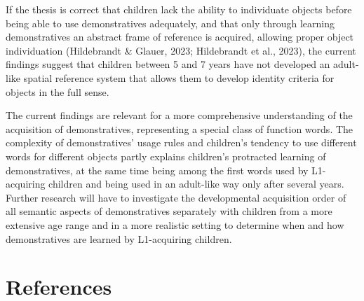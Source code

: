 \documentclass[
  man,floatsintext]{apa6}
\begin{document}
If the thesis is correct that children lack the ability to individuate objects before being able to use demonstratives adequately, and that only through learning demonstratives an abstract frame of reference is acquired, allowing proper object individuation (Hildebrandt \& Glauer, 2023; Hildebrandt et al., 2023), the current findings suggest that children between 5 and 7 years have not developed an adult-like spatial reference system that allows them to develop identity criteria for objects in the full sense.

The current findings are relevant for a more comprehensive understanding of the acquisition of demonstratives, representing a special class of function words. The complexity of demonstratives' usage rules and children's tendency to use different words for different objects partly explains children's protracted learning of demonstratives, at the same time being among the first words used by L1-acquiring children and being used in an adult-like way only after several years. Further research will have to investigate the developmental acquisition order of all semantic aspects of demonstratives separately with children from a more extensive age range and in a more realistic setting to determine when and how demonstratives are learned by L1-acquiring children.

\section{References}\label{references}

\begingroup
\setlength{\parindent}{-0.5in}
\setlength{\leftskip}{0.5in}
\end{document}
